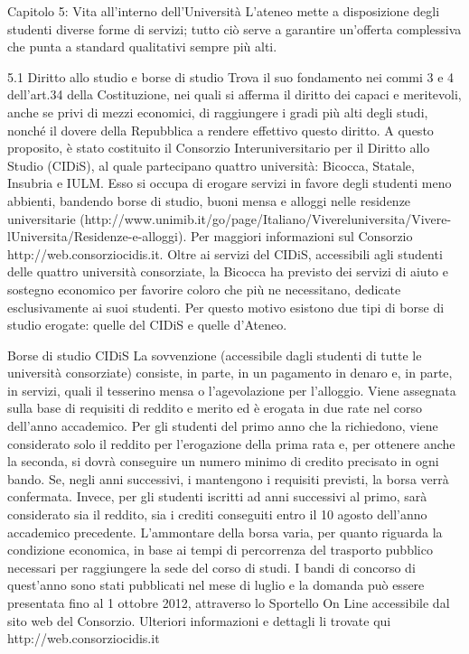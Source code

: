 Capitolo 5: Vita all'interno dell'Università
L'ateneo mette a disposizione degli studenti diverse forme di servizi; tutto ciò serve a garantire un'offerta complessiva che punta a standard qualitativi sempre più alti. 

5.1 Diritto allo studio e borse di studio
Trova il suo fondamento nei commi 3 e 4 dell'art.34 della Costituzione, nei quali si afferma il diritto dei capaci e meritevoli, anche se privi di mezzi economici, di raggiungere i gradi più alti degli studi, nonché il dovere della Repubblica a rendere effettivo questo diritto. 
A questo proposito, è stato costituito il Consorzio Interuniversitario per il Diritto allo Studio (CIDiS), al quale partecipano quattro università: Bicocca, Statale, Insubria e IULM.  Esso si occupa di erogare servizi in favore degli studenti meno abbienti, bandendo borse di studio, buoni mensa e alloggi nelle residenze universitarie (http://www.unimib.it/go/page/Italiano/Vivereluniversita/Vivere-lUniversita/Residenze-e-alloggi). Per maggiori informazioni sul Consorzio http://web.consorziocidis.it. 
Oltre ai servizi del CIDiS, accessibili agli studenti delle quattro università consorziate, la Bicocca ha previsto dei servizi di aiuto e sostegno economico per favorire coloro che più ne necessitano, dedicate esclusivamente ai suoi studenti. Per questo motivo esistono due tipi di borse di studio erogate: quelle del CIDiS e quelle d'Ateneo. 

Borse di studio CIDiS
La sovvenzione (accessibile dagli studenti di tutte le università consorziate) consiste, in parte, in un pagamento in denaro e, in parte, in servizi, quali il tesserino mensa o l'agevolazione per l'alloggio. Viene assegnata sulla base di requisiti di reddito e merito ed è erogata in due rate nel corso dell'anno accademico. Per gli studenti del primo anno che la richiedono, viene considerato solo il reddito per l'erogazione della prima rata e, per ottenere anche la seconda, si dovrà conseguire un numero minimo di credito precisato in  ogni bando. Se, negli anni successivi, i mantengono i requisiti previsti, la borsa verrà confermata. Invece, per gli studenti iscritti ad anni successivi al primo, sarà considerato sia il reddito, sia i crediti conseguiti entro il 10 agosto dell'anno accademico precedente. L'ammontare della borsa varia, per quanto riguarda la condizione economica, in base ai tempi di percorrenza del trasporto pubblico necessari per raggiungere la sede del corso di studi. 
I bandi di concorso di quest'anno sono stati pubblicati nel mese di luglio e la domanda può essere presentata fino al 1 ottobre 2012, attraverso lo Sportello On Line accessibile dal sito web del Consorzio. Ulteriori informazioni e dettagli li trovate qui http://web.consorziocidis.it

